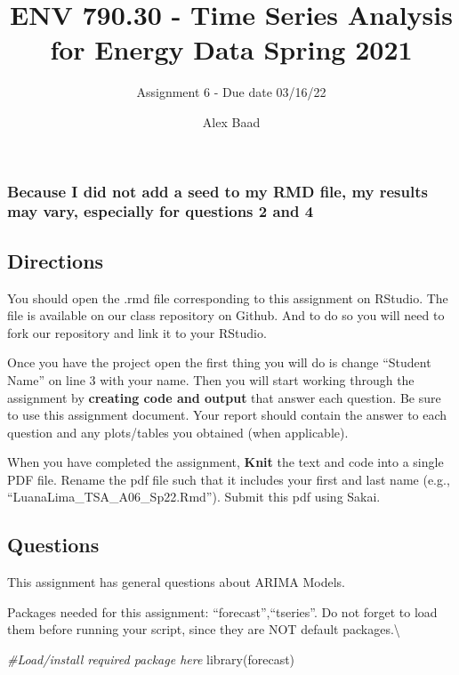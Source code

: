 \documentclass[
]{article}
\title{ENV 790.30 - Time Series Analysis for Energy Data \textbar{}
Spring 2021}
\subtitle{Assignment 6 - Due date 03/16/22}
\author{Alex Baad}
\date{}
\newenvironment{Shaded}{\begin{snugshade}}{\end{snugshade}}
\newcommand{\CommentTok}[1]{\textcolor[rgb]{0.56,0.35,0.01}{\textit{#1}}}
\newcommand{\FunctionTok}[1]{\textcolor[rgb]{0.00,0.00,0.00}{#1}}
\newcommand{\NormalTok}[1]{#1}
\begin{document}
\maketitle

\hypertarget{because-i-did-not-add-a-seed-to-my-rmd-file-my-results-may-vary-especially-for-questions-2-and-4}{%
\subsubsection{Because I did not add a seed to my RMD file, my results
may vary, especially for questions 2 and
4}\label{because-i-did-not-add-a-seed-to-my-rmd-file-my-results-may-vary-especially-for-questions-2-and-4}}

\hypertarget{directions}{%
\subsection{Directions}\label{directions}}

You should open the .rmd file corresponding to this assignment on
RStudio. The file is available on our class repository on Github. And to
do so you will need to fork our repository and link it to your RStudio.

Once you have the project open the first thing you will do is change
``Student Name'' on line 3 with your name. Then you will start working
through the assignment by \textbf{creating code and output} that answer
each question. Be sure to use this assignment document. Your report
should contain the answer to each question and any plots/tables you
obtained (when applicable).

When you have completed the assignment, \textbf{Knit} the text and code
into a single PDF file. Rename the pdf file such that it includes your
first and last name (e.g., ``LuanaLima\_TSA\_A06\_Sp22.Rmd''). Submit
this pdf using Sakai.

\hypertarget{questions}{%
\subsection{Questions}\label{questions}}

This assignment has general questions about ARIMA Models.

Packages needed for this assignment: ``forecast'',``tseries''. Do not
forget to load them before running your script, since they are NOT
default packages.\textbackslash{}

\begin{Shaded}
\begin{Highlighting}[]
\CommentTok{\#Load/install required package here}
\FunctionTok{library}\NormalTok{(forecast)}
\end{Highlighting}
\end{Shaded}
\end{document}
